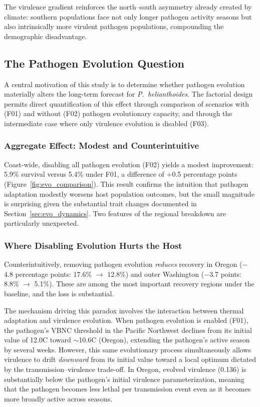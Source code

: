 The virulence gradient reinforces the north--south asymmetry already
created by climate: southern populations face not only longer pathogen
activity seasons but also intrinsically more virulent pathogen
populations, compounding the demographic disadvantage.

\subsection{The Pathogen Evolution Question}
\label{sec:pathogen_evo}

A central motivation of this study is to determine whether pathogen
evolution materially alters the long-term forecast for
\textit{P.~helianthoides}.  The factorial design permits direct
quantification of this effect through comparison of scenarios with
(F01) and without (F02) pathogen evolutionary capacity, and through the
intermediate case where only virulence evolution is disabled (F03).

\subsubsection{Aggregate Effect: Modest and Counterintuitive}

Coast-wide, disabling all pathogen evolution (F02) yields a modest
improvement: 5.9\% survival versus 5.4\% under F01, a difference of
$+$0.5 percentage points (Figure~\ref{fig:evo_comparison}).  This
result confirms the intuition that pathogen adaptation modestly
worsens host population outcomes, but the small magnitude is
surprising given the substantial trait changes documented in
Section~\ref{sec:evo_dynamics}.  Two features of the regional
breakdown are particularly unexpected.

\subsubsection{Where Disabling Evolution Hurts the Host}

Counterintuitively, removing pathogen evolution \textit{reduces}
recovery in Oregon ($-$4.8 percentage points: 17.6\% $\rightarrow$
12.8\%) and outer Washington ($-$3.7 points: 8.8\% $\rightarrow$
5.1\%).  These are among the most important recovery regions under the
baseline, and the loss is substantial.

The mechanism driving this paradox involves the interaction between
thermal adaptation and virulence evolution.  When pathogen evolution is
enabled (F01), the pathogen's VBNC threshold in the Pacific Northwest
declines from its initial value of 12.0\textdegree C toward
$\sim$10.6\textdegree C (Oregon), extending the pathogen's active
season by several weeks.  However, this same evolutionary process
simultaneously allows virulence to drift \textit{downward} from its
initial value toward a local optimum dictated by the
transmission--virulence trade-off.  In Oregon, evolved virulence
(0.136) is substantially below the pathogen's initial virulence
parameterization, meaning that the pathogen becomes less lethal per
transmission event even as it becomes more broadly active across
seasons.

